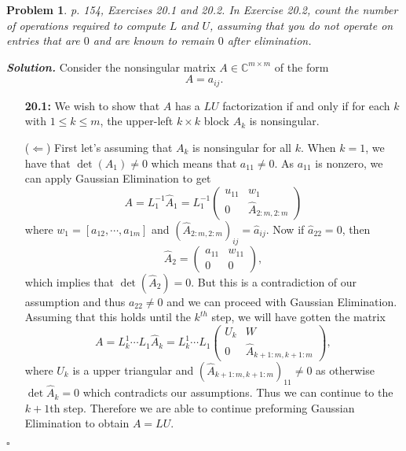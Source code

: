 \documentclass[12pt]{report}
\newtheorem{problem}{Problem}
\newenvironment{solution}[1][\it{Solution}]{\textbf{#1. } }{$\square$}
\def\C{{\mathbb C}}
\begin{document}
\newpage



\begin{problem}
    p. 154, Exercises 20.1 and 20.2.  In Exercise 20.2, count the number of operations
required to compute $L$ and $U$, assuming that you do not operate on entries that
are $0$ and are known to remain $0$ after elimination.
\end{problem}

\begin{solution}
    \noindent
    Consider the nonsingular matrix $A \in \C^{m \times m}$ of the form
    \[ A = a_{ij}.\]
    \begin{enumerate}
        \item [{\bf 20.1:}]
            We wish to show that $A$ has a $LU$ factorization if and only if for each $k$ with $1 \leq k \leq m$, the upper-left $k\times k$ block $A_{k}$ is nonsingular. 
            
            \noindent
            ($\Leftarrow$) First let's assuming that $A_{k}$ is nonsingular for all $k$. When $k=1$, we have that $\det(A_1) \neq 0$ which means that $a_{11} \neq 0$. As $a_{11}$ is nonzero, we can apply Gaussian Elimination to get
            \[ A = L^{-1}_1\hat{A}_1 = L_1^{-1}\begin{pmatrix}
                u_{11} & w_1\\ 0 & \hat{A}_{2:m,2:m}
            \end{pmatrix}\]
            where $w_1 = [a_{12}, \cdots, a_{1m}]$ and $(\hat{A}_{2:m,2:m})_{ij} = \hat{a}_{ij}$. Now if $\hat{a}_{22} = 0$, then
            \[ \hat{A}_2 = \begin{pmatrix}
                a_{11} & w_{11}\\ 0 & 0
            \end{pmatrix},\]
            which implies that $\det(\hat{A}_2) = 0$. But this is a contradiction of our assumption and thus $a_{22} \neq 0$ and we can proceed with Gaussian Elimination. Assuming that this holds until the $k^{th}$ step, we will have gotten the matrix
            \[ A = L_k^1\cdots L_1 \hat{A}_k = L_k^1\cdots L_1 \begin{pmatrix}
                U_k & W \\ 0 & \hat{A}_{k+1:m,k+1:m}
            \end{pmatrix},\]
            where $U_k$ is a upper triangular and $(\hat{A}_{k+1:m,k+1:m})_{11} \neq 0$ as otherwise $\det{\hat{A}_k} = 0$ which contradicts our assumptions. Thus we can continue to the $k+1$th step. Therefore we are able to continue preforming Gaussian Elimination to obtain $A = LU$.   


\end{enumerate}
\end{solution}
\end{document}
